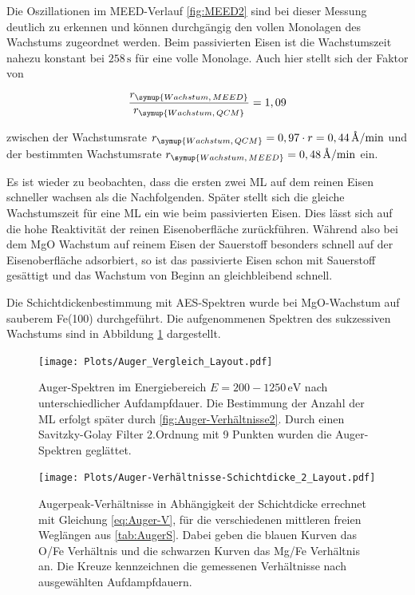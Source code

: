 Die Oszillationen im MEED-Verlauf \ref{fig:MEED2} sind bei dieser Messung deutlich zu erkennen und können durchgängig 
den vollen Monolagen des Wachstums zugeordnet werden. Beim passivierten Eisen ist die Wachstumszeit nahezu konstant bei $258\,\si{\second}$ für eine volle Monolage.
Auch hier stellt sich der Faktor von

%
\begin{equation*}
  \frac{r_{\symup{Wachstum,\, MEED}}}{r_{\symup{Wachstum,\, QCM}}}=1,09
\end{equation*} 

zwischen der Wachstumsrate $r_{\symup{Wachstum,\, QCM}}=0,97\cdot r=0,44\,\si{\angstrom\per\minute}$ und 
der bestimmten Wachstumsrate $r_{\symup{Wachstum,\, MEED}}=0,48\,\si{\angstrom\per\minute}$ ein.

Es ist wieder zu beobachten, dass die ersten zwei ML auf dem reinen Eisen schneller wachsen als die Nachfolgenden.
Später stellt sich die gleiche Wachstumszeit für eine ML ein wie beim passivierten Eisen.
Dies lässt sich auf die hohe Reaktivität der reinen Eisenoberfläche zurückführen.
Während also bei dem MgO Wachstum auf reinem Eisen der Sauerstoff besonders schnell auf der Eisenoberfläche adsorbiert, 
so ist das passivierte Eisen schon mit Sauerstoff gesättigt und das Wachstum von Beginn an gleichbleibend schnell.

Die Schichtdickenbestimmung mit AES-Spektren wurde bei MgO-Wachstum auf sauberem Fe(100) durchgeführt.
Die aufgenommenen Spektren des sukzessiven Wachstums sind in Abbildung \ref{fig:Auger1} dargestellt.

\begin{figure}
  \centering
  \texttt{[image: Plots/Auger\_Vergleich\_Layout.pdf]}
  \caption{Auger-Spektren im Energiebereich $E=200-1250\, \si{\eV}$ nach unterschiedlicher Aufdampfdauer. 
          Die Bestimmung der Anzahl der ML erfolgt später durch \ref{fig:Auger-Verhältnisse2}. Durch einen Savitzky-Golay Filter 2.\nobreakspace Ordnung mit 9 Punkten wurden die
          Auger-Spektren geglättet.}
  \label{fig:Auger1}
\end{figure}



\begin{figure}[H]
  \centering
  \texttt{[image: Plots/Auger-Verhältnisse-Schichtdicke\_2\_Layout.pdf]}
  \caption{Augerpeak-Verhältnisse in Abhängigkeit der Schichtdicke errechnet mit Gleichung \ref{eq:Auger-V}, für die verschiedenen
           mittleren freien Weglängen aus \ref{tab:AugerS}. Dabei geben die blauen Kurven das O/Fe Verhältnis und die schwarzen Kurven das Mg/Fe Verhältnis an.
           Die Kreuze kennzeichnen die gemessenen Verhältnisse nach ausgewählten Aufdampfdauern.}
  \label{fig:Auger-Verhältnisse1}
\end{figure}

